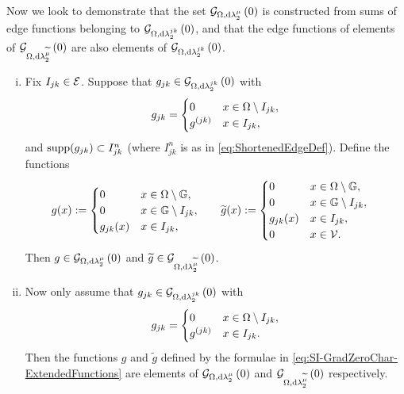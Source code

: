 Now we look to demonstrate that the set $\mathcal{G}_{ \Omega, \mathrm{d}\lambda_2^{\mu}}\left( 0 \right)$ is constructed from sums of edge functions belonging to $\mathcal{G}_{ \Omega, \mathrm{d}\lambda_2^{jk}}\left( 0 \right)$, and that the edge functions of elements of $\mathcal{G}_{ \Omega, \mathrm{d}\lambda_2^{\widetilde{\mu}}}\left( 0 \right)$ are also elements of $\mathcal{G}_{ \Omega, \mathrm{d}\lambda_2^{jk}}\left( 0 \right)$.
\begin{prop} \label{prop:SI-GradZeroExtensionAndChar}
	
	\begin{enumerate}[(i)]
		\item Fix $I_{jk}\in\mathcal{E}$.
		Suppose that $g_{jk}\in\mathcal{G}_{ \Omega, \mathrm{d}\lambda_2^{jk}}\left( 0 \right)$ with
		\begin{align*}
			g_{jk} = \begin{cases} 0 & x\in\Omega\setminus I_{jk}, \\ g^{(jk)} & x\in I_{jk}, \end{cases}
		\end{align*}
		and $\mathrm{supp}(g_{jk})\subset I_{jk}^n$ (where $I_{jk}^n$ is as in \eqref{eq:ShortenedEdgeDef}).
		Define the functions
		\begin{align} \label{eq:SI-GradZeroChar-ExtendedFunctions}
			g(x) := \begin{cases} 0 & x\in\Omega\setminus\mathbb{G}, \\ 0 & x\in\mathbb{G}\setminus I_{jk}, \\ g_{jk}(x) & x\in I_{jk}, \end{cases}
			&\qquad
			\widetilde{g}(x) := \begin{cases} 0 & x\in\Omega\setminus\mathbb{G}, \\ 0 & x\in\mathbb{G}\setminus I_{jk}, \\ g_{jk}(x) & x\in I_{jk}, \\ 0 & x\in\mathcal{V}. \end{cases}			
		\end{align}
		Then $g\in\mathcal{G}_{ \Omega, \mathrm{d}\lambda_2^{\mu}}\left( 0 \right)$ and $\widetilde{g}\in\mathcal{G}_{ \Omega, \mathrm{d}\lambda_2^{\widetilde{\mu}}}\left( 0 \right)$.
		\item Now only assume that $g_{jk}\in\mathcal{G}_{ \Omega, \mathrm{d}\lambda_2^{jk}}\left( 0 \right)$ with
		\begin{align*}
			g_{jk} = \begin{cases} 0 & x\in\Omega\setminus I_{jk}, \\ g^{(jk)} & x\in I_{jk}. \end{cases}
		\end{align*}
		Then the functions $g$ and $\widetilde{g}$ defined by the formulae in \eqref{eq:SI-GradZeroChar-ExtendedFunctions} are elements of $\mathcal{G}_{ \Omega, \mathrm{d}\lambda_2^{\mu}}\left( 0 \right)$ and $\mathcal{G}_{ \Omega, \mathrm{d}\lambda_2^{\widetilde{\mu}}}\left( 0 \right)$ respectively.

\end{enumerate}
\end{prop}
